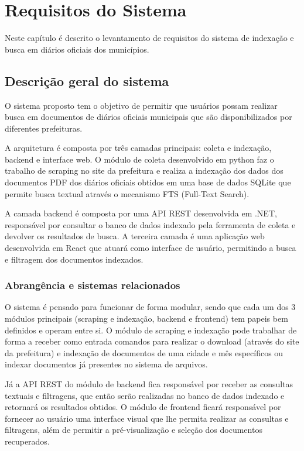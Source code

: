 \chapter[Requisitos do Sistema]{Requisitos do Sistema}

Neste capítulo é descrito o levantamento de requisitos do sistema de indexação e busca em diários oficiais dos municípios.

\section{Descrição geral do sistema}
O sistema proposto tem o objetivo de permitir que usuários possam realizar busca em documentos de diários oficiais municipais que são disponibilizados por diferentes prefeituras.

A arquitetura é composta por três camadas principais: coleta e indexação, backend e interface web. O módulo de coleta desenvolvido em python faz o trabalho de scraping no site da prefeitura e realiza a indexação dos dados dos documentos PDF dos diários oficiais obtidos em uma base de dados SQLite que permite busca textual através o mecanismo FTS (Full-Text Search).

A camada backend é composta por uma API REST desenvolvida em .NET, responsável por consultar o banco de dados indexado pela ferramenta de coleta e devolver os resultados de busca. A terceira camada é uma aplicação web desenvolvida em React que atuará como interface de usuário, permitindo a busca e filtragem dos documentos indexados.

\subsection{Abrangência e sistemas relacionados}

O sistema é pensado para funcionar de forma modular, sendo que cada um dos 3 módulos principais (scraping e indexação, backend e frontend) tem papeis bem definidos e operam entre si. O módulo de scraping e indexação pode trabalhar de forma a receber como entrada comandos para realizar o download (através do site da prefeitura) e indexação de documentos de uma cidade e mês específicos ou indexar documentos já presentes no sistema de arquivos.

Já a API REST do módulo de backend fica responsável por receber as consultas textuais e filtragens, que então serão realizadas no banco de dados indexado e retornará os resultados obtidos. O módulo de frontend ficará responsável por fornecer ao usuário uma interface visual que lhe permita realizar as consultas e filtragens, além de permitir a pré-visualização e seleção dos documentos recuperados.

